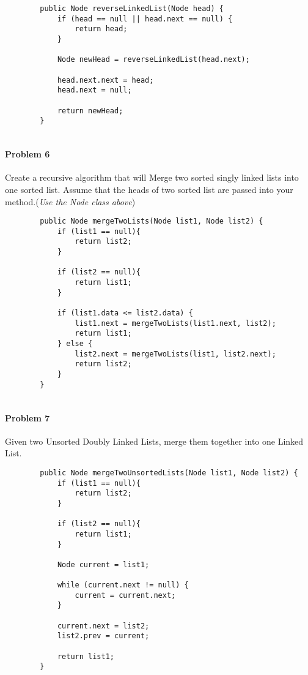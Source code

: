 \documentclass[letterpaper]{article}
\begin{document}
	\begin{verbatim}
        public Node reverseLinkedList(Node head) {
            if (head == null || head.next == null) {
                return head;
            }
            
            Node newHead = reverseLinkedList(head.next);
            
            head.next.next = head;
            head.next = null; 
            
            return newHead;
        }
		
	\end{verbatim}
	
	\paragraph{Problem 6} Create a recursive algorithm that will Merge two sorted singly linked lists into one sorted list. Assume that the heads of two sorted list are passed into your method.(\textit{Use the Node class above})
	
	\begin{verbatim}
        public Node mergeTwoLists(Node list1, Node list2) {
            if (list1 == null){
                return list2;
            }
            
            if (list2 == null){
                return list1;
            }
            
            if (list1.data <= list2.data) {
                list1.next = mergeTwoLists(list1.next, list2);
                return list1;
            } else {
                list2.next = mergeTwoLists(list1, list2.next);
                return list2;
            }
        }
		
	\end{verbatim}
	
	\paragraph{Problem 7} Given two Unsorted Doubly Linked Lists, merge them together into one Linked List.
	
	\begin{verbatim}
        public Node mergeTwoUnsortedLists(Node list1, Node list2) {
            if (list1 == null){
                return list2;
            }
            
            if (list2 == null){
                return list1;
            }
            
            Node current = list1;
            
            while (current.next != null) {
                current = current.next;
            }
            
            current.next = list2;
            list2.prev = current; 
            
            return list1;
        }
		
	\end{verbatim}
	
\end{document}
